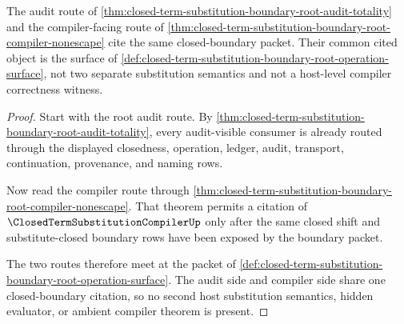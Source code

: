 \begin{theorem}
\label{thm:closed-term-substitution-boundary-root-audit-compiler-coherence}
The audit route of \autoref{thm:closed-term-substitution-boundary-root-audit-totality} and the compiler-facing route of \autoref{thm:closed-term-substitution-boundary-root-compiler-nonescape} cite the same closed-boundary packet. Their common cited object is the surface of \autoref{def:closed-term-substitution-boundary-root-operation-surface}, not two separate substitution semantics and not a host-level compiler correctness witness.
\end{theorem}
\begin{proof}
Start with the root audit route. By \autoref{thm:closed-term-substitution-boundary-root-audit-totality}, every audit-visible consumer is already routed through the displayed closedness, operation, ledger, audit, transport, continuation, provenance, and naming rows.

Now read the compiler route through \autoref{thm:closed-term-substitution-boundary-root-compiler-nonescape}. That theorem permits a citation of $\ClosedTermSubstitutionCompilerUp$ only after the same closed shift and substitute-closed boundary rows have been exposed by the boundary packet.

The two routes therefore meet at the packet of \autoref{def:closed-term-substitution-boundary-root-operation-surface}. The audit side and compiler side share one closed-boundary citation, so no second host substitution semantics, hidden evaluator, or ambient compiler theorem is present.
\end{proof}

